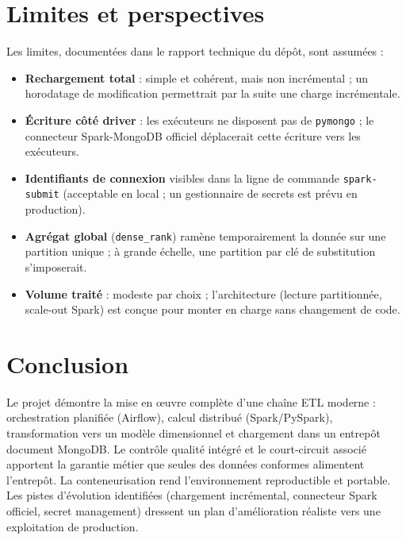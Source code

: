 ﻿\documentclass[10pt,a4paper]{article}
\begin{document}
\section{Limites et perspectives}\label{sec:limites}
Les limites, documentées dans le rapport technique du dépôt, sont assumées :
\begin{itemize}
  \item \textbf{Rechargement total} : simple et cohérent, mais non incrémental ; un horodatage de
        modification permettrait par la suite une charge incrémentale.
  \item \textbf{Écriture côté driver} : les exécuteurs ne disposent pas de \texttt{pymongo} ; le
        connecteur Spark-MongoDB officiel déplacerait cette écriture vers les exécuteurs.
  \item \textbf{Identifiants de connexion} visibles dans la ligne de commande
        \texttt{spark-submit} (acceptable en local ; un gestionnaire de secrets est prévu en
        production).
  \item \textbf{Agrégat global} (\texttt{dense\_rank}) ramène temporairement la donnée sur une
        partition unique ; à grande échelle, une partition par clé de substitution s'imposerait.
  \item \textbf{Volume traité} : modeste par choix ; l'architecture (lecture partitionnée, scale-out
        Spark) est conçue pour monter en charge sans changement de code.
\end{itemize}

\section{Conclusion}\label{sec:conclusion}
Le projet démontre la mise en \oe uvre complète d'une chaîne ETL moderne : orchestration planifiée
(Airflow), calcul distribué (Spark/PySpark), transformation vers un modèle dimensionnel et
chargement dans un entrepôt document MongoDB. Le contrôle qualité intégré et le court-circuit
associé apportent la garantie métier que seules des données conformes alimentent l'entrepôt. La
conteneurisation rend l'environnement reproductible et portable. Les pistes d'évolution identifiées
(chargement incrémental, connecteur Spark officiel, secret management) dressent un plan
d'amélioration réaliste vers une exploitation de production.
\end{document}

